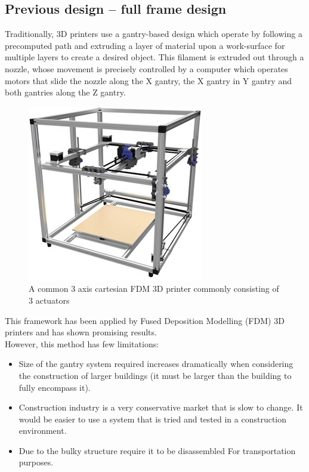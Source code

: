 \documentclass{UoNMCHA}
\numberwithin{equation}{section}
\begin{document}
	\subsection*{Previous design – full frame design}
	Traditionally, 3D printers use a gantry-based design which operate by following a precomputed path and extruding a layer of material upon a work-surface for multiple layers to create a desired object. This filament is extruded out through a nozzle, whose movement is precisely controlled by a computer which operates motors that slide the nozzle along the X gantry, the X gantry in Y gantry and both gantries along the Z gantry. 
	
	\begin{figure}[H]
		\begin{center}
			\includegraphics[width=.6\linewidth]{figs/Picture1}
			\caption{A  common 3 axis cartesian FDM 3D printer commonly consisting of 3 actuators}
			\label{figs/Picture1}
		\end{center}
	\end{figure}
	
	This framework has been applied by Fused Deposition Modelling (FDM) 3D printers and has shown promising results. \\
	However, this method has few limitations:
	
	\begin{itemize}
		\item Size of the gantry system required increases dramatically when considering the construction of larger buildings (it must be larger than the building to fully encompass it).
		\item Construction industry is a very conservative market that is slow to change. It would be easier to use a system that is tried and tested in a construction environment.
		\item Due to the bulky structure require it to be disassembled For transportation purposes.
		
	\end{itemize}
	
\end{document}
